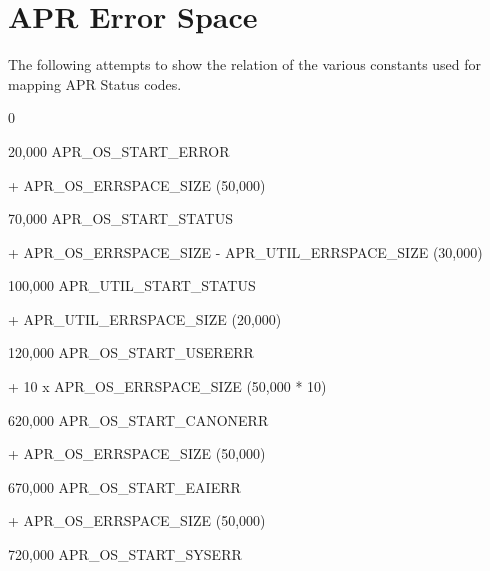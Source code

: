 \hypertarget{group___a_p_r___e_r_r_o_r__map}{}\section{A\+PR Error Space}
\label{group___a_p_r___e_r_r_o_r__map}

\begin{DoxyPre}
The following attempts to show the relation of the various constants
used for mapping APR Status codes.
\begin{DoxyVerb}  0
\end{DoxyVerb}
\end{DoxyPre}



\begin{DoxyPre} 20,000     APR\_OS\_START\_ERROR
\begin{DoxyVerb}   + APR_OS_ERRSPACE_SIZE (50,000)
\end{DoxyVerb}
\end{DoxyPre}



\begin{DoxyPre} 70,000      APR\_OS\_START\_STATUS
\begin{DoxyVerb}   + APR_OS_ERRSPACE_SIZE - APR_UTIL_ERRSPACE_SIZE (30,000)
\end{DoxyVerb}
\end{DoxyPre}



\begin{DoxyPre}100,000      APR\_UTIL\_START\_STATUS
\begin{DoxyVerb}    + APR_UTIL_ERRSPACE_SIZE (20,000)
\end{DoxyVerb}
\end{DoxyPre}



\begin{DoxyPre}120,000      APR\_OS\_START\_USERERR
\begin{DoxyVerb}    + 10 x APR_OS_ERRSPACE_SIZE (50,000 * 10)
\end{DoxyVerb}
\end{DoxyPre}



\begin{DoxyPre}620,000      APR\_OS\_START\_CANONERR
\begin{DoxyVerb}    + APR_OS_ERRSPACE_SIZE (50,000)
\end{DoxyVerb}
\end{DoxyPre}



\begin{DoxyPre}670,000      APR\_OS\_START\_EAIERR
\begin{DoxyVerb}    + APR_OS_ERRSPACE_SIZE (50,000)
\end{DoxyVerb}
\end{DoxyPre}



\begin{DoxyPre}720,000      APR\_OS\_START\_SYSERR\end{DoxyPre}



\begin{DoxyPre}\end{DoxyPre}
 
